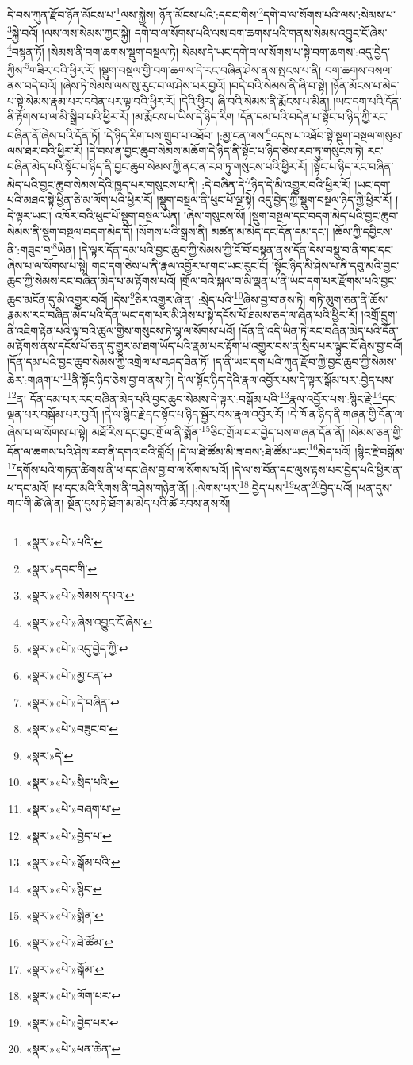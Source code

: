 དེ་བས་ཀུན་རྫོབ་ཉོན་མོངས་པ་\footnote{«སྣར་»«པེ་»པའི་}ལས་སྐྱེས། ཉོན་མོངས་པའི་:དབང་གིས་\footnote{«སྣར་»དབང་གི་}དགེ་བ་ལ་སོགས་པའི་ལས་:སེམས་པ་\footnote{«སྣར་»«པེ་»སེམས་དཔའ་}སྐྱེ་བའོ། །ལས་ལས་སེམས་ཀྱང་སྐྱེ། དགེ་བ་ལ་སོགས་པའི་ལས་བག་ཆགས་པའི་གནས་སེམས་འབྱུང་ངོ་ཞེས་\footnote{«སྣར་»«པེ་»ཞེས་འབྱུང་ངོ་ཞེས་}བསྟན་ཏོ། །སེམས་ནི་བག་ཆགས་སྡུག་བསྔལ་ཏེ། སེམས་དེ་ཡང་དགེ་བ་ལ་སོགས་པ་སྟེ་བག་ཆགས་:འདུ་བྱེད་ཀྱིས་\footnote{«སྣར་»«པེ་»འདུ་བྱེད་ཀྱི་}གཟིར་བའི་ཕྱིར་རོ། །སྡུག་བསྔལ་གྱི་བག་ཆགས་དེ་རང་བཞིན་ཤེས་ནས་སྤངས་པ་ནི། བག་ཆགས་བསལ་ནས་བདེ་བའོ། །ཞེས་ཏེ་སེམས་ལས་སུ་རུང་བ་ལ་ཤེས་པར་བྱའོ། །བདེ་བའི་སེམས་ནི་ཞི་བ་སྟེ། །ཉོན་མོངས་པ་མེད་པ་སྟེ་སེམས་རྣམ་པར་དབེན་པར་ལྟ་བའི་ཕྱིར་རོ། །དེའི་ཕྱིར། ཞི་བའི་སེམས་ནི་རྨོངས་པ་མིན། །ཡང་དག་པའི་དོན་ནི་རྟོགས་པ་ལ་མི་སྒྲིབ་པའི་ཕྱིར་རོ། །མ་རྨོངས་པ་ཡིས་དེ་ཉིད་རིག །དོན་དམ་པའི་བདེན་པ་སྟོང་པ་ཉིད་ཀྱི་རང་བཞིན་ནོ་ཞེས་པའི་དོན་ཏོ། །དེ་ཉིད་རིག་པས་གྲུབ་པ་འཐོབ། །:མྱ་ངན་ལས་\footnote{«སྣར་»«པེ་»མྱ་ངན་}འདས་པ་འཐོབ་སྟེ་སྡུག་བསྔལ་གསུམ་ལས་ཐར་བའི་ཕྱིར་རོ། །དེ་བས་ན་བྱང་ཆུབ་སེམས་མཆོག་དེ་ཉིད་ནི་སྟོང་པ་ཉིད་ཅེས་རབ་ཏུ་གསུངས་ཏེ། རང་བཞིན་མེད་པའི་སྟོང་པ་ཉིད་ནི་བྱང་ཆུབ་སེམས་ཀྱི་ནང་ན་རབ་ཏུ་གསུངས་པའི་ཕྱིར་རོ། །སྟོང་པ་ཉིད་རང་བཞིན་མེད་པའི་བྱང་ཆུབ་སེམས་དེའི་ཁྱད་པར་གསུངས་པ་ནི། :དེ་བཞིན་དེ་\footnote{«སྣར་»«པེ་»དེ་བཞིན་}ཉིད་དེ་མི་འགྱུར་བའི་ཕྱིར་རོ། །ཡང་དག་པའི་མཐའ་སྟེ་ཕྱིན་ཅི་མ་ལོག་པའི་ཕྱིར་རོ། །སྡུག་བསྔལ་ནི་ཕུང་པོ་ལྔ་སྟེ། འདུ་བྱེད་ཀྱི་སྡུག་བསྔལ་ཉིད་ཀྱི་ཕྱིར་རོ། །དེ་ལྟར་ཡང་། འཁོར་བའི་ཕུང་པོ་སྡུག་བསྔལ་ཡིན། །ཞེས་གསུངས་སོ། །སྡུག་བསྔལ་དང་བདག་མེད་པའི་བྱང་ཆུབ་སེམས་ནི་སྡུག་བསྔལ་བདག་མེད་དོ། །སོགས་པའི་སྒྲས་ནི། མཚན་མ་མེད་དང་དོན་དམ་དང་། །ཆོས་ཀྱི་དབྱིངས་ནི་:གཟུང་བ་\footnote{«སྣར་»«པེ་»བཟུང་བ་}ཡིན། །དེ་ལྟར་དོན་དམ་པའི་བྱང་ཆུབ་ཀྱི་སེམས་ཀྱི་ངོ་བོ་བསྟན་ནས་དོན་དེས་བསྡུ་བ་ནི་གང་དང་ཞེས་པ་ལ་སོགས་པ་སྟེ། གང་དག་ཅེས་པ་ནི་རྣལ་འབྱོར་པ་གང་ཡང་རུང་ངོ། །སྟོང་ཉིད་མི་ཤེས་པ་ནི་དབུ་མའི་བྱང་ཆུབ་ཀྱི་སེམས་རང་བཞིན་མེད་པ་མ་རྟོགས་པའོ། །གྲོལ་བའི་སྐལ་བ་མི་ལྡན་པ་ནི་ཡང་དག་པར་རྫོགས་པའི་བྱང་ཆུབ་མངོན་དུ་མི་འགྱུར་བའོ། །དེས་\footnote{«སྣར་»དེ་}ཅིར་འགྱུར་ཞེ་ན། :སྲེད་པའི་\footnote{«སྣར་»«པེ་»སྲིད་པའི་}ཞེས་བྱ་བ་ནས་ཏེ། གཏི་མུག་ཅན་ནི་ཆོས་རྣམས་རང་བཞིན་མེད་པའི་དོན་ཡང་དག་པར་མི་ཤེས་པ་སྟེ་དངོས་པོ་ཐམས་ཅད་ལ་ཞེན་པའི་ཕྱིར་རོ། །འགྲོ་དྲུག་ནི་འཇིག་རྟེན་པའི་ལྟ་བའི་ཚུལ་གྱིས་གསུངས་ཏེ་ལྷ་ལ་སོགས་པའོ། །དོན་ནི་འདི་ཡིན་ཏེ་རང་བཞིན་མེད་པའི་དོན་མ་རྟོགས་ནས་དངོས་པོ་ཅན་དུ་གྱུར་མ་ཐག་ཡོད་པའི་རྣམ་པར་རྟོག་པ་འགྱུར་བས་ན་སྲིད་པར་ལྟུང་ངོ་ཞེས་བྱ་བའོ། །དོན་དམ་པའི་བྱང་ཆུབ་སེམས་ཀྱི་འགྲེལ་པ་བཤད་ཟིན་ཏོ། །ད་ནི་ཡང་དག་པའི་ཀུན་རྫོབ་ཀྱི་བྱང་ཆུབ་ཀྱི་སེམས་ཆེར་:གཞག་པ་\footnote{«སྣར་»«པེ་»བཞག་པ་}ནི་སྟོང་ཉིད་ཅེས་བྱ་བ་ནས་ཏེ། དེ་ལ་སྟོང་ཉིད་དེའི་རྣལ་འབྱོར་པས་དེ་ལྟར་སྒོམ་པར་:བྱེད་པས་\footnote{«སྣར་»«པེ་»བྱེད་པ་}ན། དོན་དམ་པར་རང་བཞིན་མེད་པའི་བྱང་ཆུབ་སེམས་དེ་ལྟར་:བསྒོམ་པའི་\footnote{«སྣར་»«པེ་»སྒོམ་པའི་}རྣལ་འབྱོར་པས་:སྙིང་རྗེ་\footnote{«སྣར་»«པེ་»སྙིང་}དང་ལྡན་པར་བསྒོམ་པར་བྱའོ། །དེ་ལ་སྙིང་རྗེ་དང་སྟོང་པ་ཉིད་སྦྱོར་བས་རྣལ་འབྱོར་རོ། །དེ་ཁོ་ན་ཉིད་ནི་གཞན་གྱི་དོན་ལ་ཞེས་པ་ལ་སོགས་པ་སྟེ། མཐོ་རིས་དང་བྱང་གྲོལ་ནི་སྨོན་\footnote{«སྣར་»«པེ་»སྨིན་}ཅིང་གྲོལ་བར་བྱེད་པས་གཞན་དོན་ནོ། །སེམས་ཅན་གྱི་དོན་ལ་ཆགས་པའི་ཤེས་རབ་ནི་དགའ་བའི་བློའོ། །དེ་ལ་ཐེ་ཚོམ་མི་ཟ་བས་:ཐེ་ཚོམ་ཡང་\footnote{«སྣར་»«པེ་»ཐེ་ཚོམ་}མེད་པའོ། །སྙིང་རྗེ་བསྒོམ་\footnote{«སྣར་»«པེ་»སྒོམ་}དགོས་པའི་གཏན་ཚིགས་ནི་ཕ་དང་ཞེས་བྱ་བ་ལ་སོགས་པའོ། །དེ་ལ་ས་བོན་དང་ལུས་རྟས་པར་བྱེད་པའི་ཕྱིར་ན་ཕ་དང་མའོ། །ཕ་དང་མའི་རིགས་ནི་བཤེས་གཉེན་ནོ། །:ལེགས་པར་\footnote{«སྣར་»«པེ་»ལོག་པར་}:བྱེད་པས་\footnote{«སྣར་»«པེ་»བྱེད་པར་}ཕན་\footnote{«སྣར་»«པེ་»ཕན་ཆེན་}བྱེད་པའོ། །ཕན་དུས་གང་གི་ཚེ་ཞེ་ན། སྔོན་དུས་ཏེ་ཐོག་མ་མེད་པའི་ཚེ་རབས་ནས་སོ། 